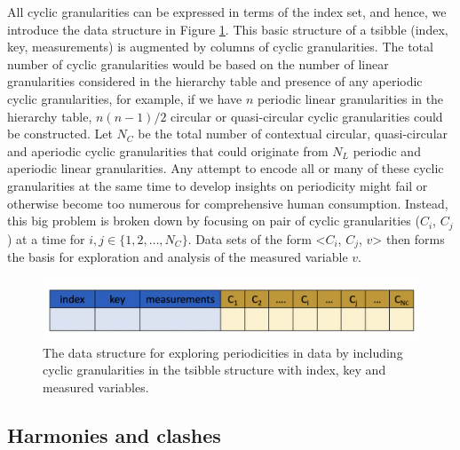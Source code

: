 \documentclass[12pt]{article}
\begin{document}
\noindent All cyclic granularities can be expressed in terms of the index set, and hence, we introduce the data structure in Figure \ref{fig:data-structure}. This basic structure of a tsibble (index, key, measurements) is augmented by columns of cyclic granularities. The total number of cyclic granularities would be based on the number of linear granularities considered in the hierarchy table and presence of any aperiodic cyclic granularities, for example, if we have \(n\) periodic linear granularities in the hierarchy table, \(n(n-1)/2\) circular or quasi-circular cyclic granularities could be constructed. Let \(N_C\) be the total number of contextual circular, quasi-circular and aperiodic cyclic granularities that could originate from \(N_L\) periodic and aperiodic linear granularities. Any attempt to encode all or many of these cyclic granularities at the same time to develop insights on periodicity might fail or otherwise become too numerous for comprehensive human consumption. Instead, this big problem is broken down by focusing on pair of cyclic granularities (\(C_i\), \(C_j\)) at a time for \(i, j \in \{1, 2, \dots, N_C\}\). Data sets of the form \textless{}\(C_i\), \(C_j\), \(v\)\textgreater{} then forms the basis for exploration and analysis of the measured variable \(v\).

\begin{figure}[htb]

{\centering \includegraphics[width=\textwidth]{Figs/data-struc-diffcol} 

}

\caption{The data structure for exploring periodicities in data by including cyclic granularities in the tsibble structure with index, key and measured variables.}\label{fig:data-structure}
\end{figure}



\hypertarget{sec:synergy}{%
\subsection{Harmonies and clashes}\label{sec:synergy}}
\end{document}
